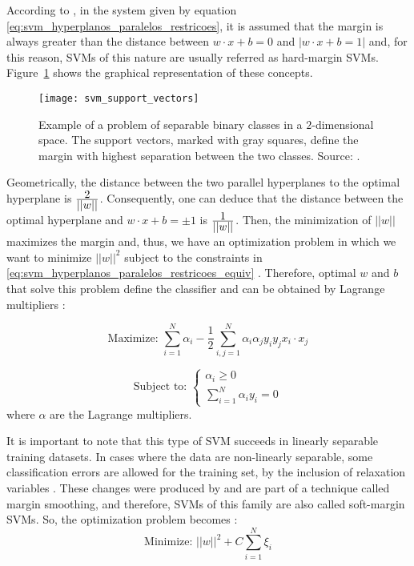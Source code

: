 According to \citet{campbell:00}, in the system given by equation \ref{eq:svm_hyperplanos_paralelos_restricoes}, it is assumed that the margin is always greater than the distance between $w \cdot x + b = 0$ and $|w \cdot x + b = 1|$ and, for this reason, SVMs of this nature are usually referred as hard-margin SVMs. Figure~\ref{fig:svm_support_vectors} shows the graphical representation of these concepts.

\begin{figure}[ht]
  \centering
  \texttt{[image: svm\_support\_vectors]}
  \caption[Example of a problem of separable binary classes in a $2$-dimensional space]{Example of a problem of separable binary classes in a $2$-dimensional space. The support vectors, marked with gray squares, define the margin with highest separation between the two classes. Source: \citet{cortes:95}.}
  \label{fig:svm_support_vectors}
\end{figure}

Geometrically, the distance between the two parallel hyperplanes to the optimal hyperplane is $\frac{\displaystyle 2}{\displaystyle ||w||}$. Consequently, one can deduce that the distance between the optimal hyperplane and $w \cdot x + b = \pm 1$ is $\frac{\displaystyle 1}{\displaystyle ||w||}$. Then, the minimization of $||w||$ maximizes the margin and, thus, we have an optimization problem in which we want to minimize $||w||^2$ subject to the constraints in \ref{eq:svm_hyperplanos_paralelos_restricoes_equiv} \citep{lorena:03}. Therefore, optimal $w$ and $b$ that solve this problem define the classifier and can be obtained by Lagrange multipliers \citep{campbell:00}:

\begin{equation}
\label{eq:svm_margens_rigidas}
\text{Maximize: } \sum_{i=1}^N \alpha_i - \frac{1}{2} \sum_{i, j=1}^N \alpha_i \alpha_j y_i y_j x_i\cdot x_j
\end{equation}

\begin{equation}
\label{eq:svm_margens_rigidas_restricoes}
\text{Subject to: }
\begin{cases}
    \alpha_i \geq 0\\[1em]
    \sum_{i=1}^N \alpha_i y_i = 0
\end{cases}
\end{equation}
\noindent where $\alpha$ are the Lagrange multipliers.

It is important to note that this type of SVM succeeds in linearly separable training datasets. In cases where the data are non-linearly separable, some classification errors are allowed for the training set, by the inclusion of relaxation variables \citep{lorena:03}. These changes were produced by \citet{cortes:95} and are part of a technique called margin smoothing, and therefore, SVMs of this family are also called soft-margin SVMs. So, the optimization problem becomes \citep{lorena:03}:
\begin{equation}
\label{eq:svm_margens_suaves_def}
\text{Minimize: } ||w||^2 + C\sum_{i=1}^N \xi_i
\end{equation}

